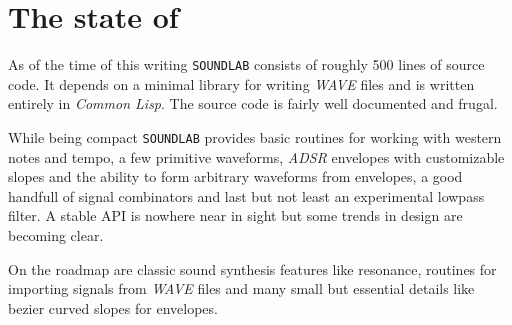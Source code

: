 \section{The state of }

As of the time of this writing \texttt{SOUNDLAB} consists of roughly 500
lines of source code. It depends on a minimal library for writing
\textit{WAVE} files and is written entirely in \textit{Common Lisp}. The
source code is fairly well documented and frugal.

While being compact \texttt{SOUNDLAB} provides basic routines for working
with western notes and tempo, a few primitive waveforms, \textit{ADSR}
envelopes with customizable slopes and the ability to form arbitrary
waveforms from envelopes, a good handfull of signal combinators and last
but not least an experimental lowpass filter. A stable API is nowhere
near in sight but some trends in design are becoming clear.

On the roadmap are classic sound synthesis features like resonance,
routines for importing signals from \textit{WAVE} files and many small
but essential details like bezier curved slopes for envelopes.

